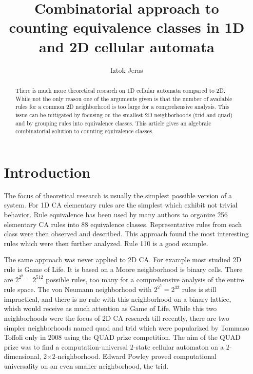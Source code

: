 \documentclass{ijuc}
\begin{document}
\title{Combinatorial approach to counting equivalence classes in 1D and 2D cellular automata}
\author{Iztok Jeras}
\def\received{Received 17 December 2004; In final form 1 April 2005}

\maketitle

\begin{abstract}
There is much more theoretical research on 1D cellular automata compared to 2D.
While not the only reason one of the arguments given is that the number of
available rules for a common 2D neighborhood is too large for a comprehensive
analysis. This issue can be mitigated by focusing on the smallest 2D neighborhoods
(trid and quad) and by grouping rules into equivalence classes. This article
gives an algebraic combinatorial solution to counting equivalence classes.
\end{abstract}


\section{Introduction}

The focus of theoretical research is usually the simplest possible version of a system.
For 1D CA elementary rules are the simplest which exhibit not trivial behavior. Rule
equivalence has been used by many authors to organize 256 elementary CA rules into 88
equivalence classes. Representative rules from each class were then observed and described.
This approach found the most interesting rules which were then further analyzed. Rule 110
is a good example.

The same approach was never applied to 2D CA. For example most studied 2D rule is Game of Life.
It is based on a Moore neighborhood is binary cells. There are $2^{2^9}=2^512$ possible rules,
too many for a comprehensive analysis of the entire rule space. The von Neumann neighborhood
with $2^{2^5}=2^32$ rules is still impractical, and there is no rule with this neighborhood on
a binary lattice, whish would receive as much attention as Game of Life. While this two
neighborhoods were the focus of 2D CA research till recently, there are two simpler neighborhoods
named quad and trid which were popularized by Tommaso Toffoli only in 2008 using the QUAD prize competition.
The aim of the QUAD prize was to find a computation-universal 2-state cellular automaton on a 2-dimensional,
2×2-neighborhood. Edward Powley proved computational universality on an even smaller neighborhood, the trid.
\end{document}

